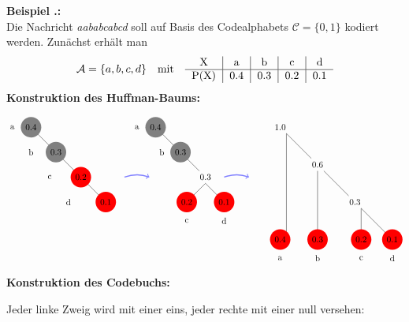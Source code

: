 \documentclass[a4paper,12pt]{article}
\newcommand{\A}{\mathcal A}
\newcommand{\C}{\mathcal C}
\newcounter{Beispiel}
\newenvironment{Beispiel}{
\medskip
        
        \setlength{\parindent}{0pt}
        \addtocounter{Beispiel}{1}
        \textbf{\textsf{Beispiel \thesubsection.\theBeispiel}:}\\}{
        \nopagebreak
        \vspace{-1.0ex}
        \bigskip
        
}
\begin{document}
\begin{Beispiel}
Die Nachricht {\it aababcabcd} soll auf Basis des Codealphabets $\C=\{0,1\}$ kodiert werden. Zunächst erhält man
\begin{align*}
 \A = \{a, b, c, d\}\quad \text{mit}\quad
\begin{tabular}{c|c|c|c|c}
X & a & b & c & d
\\
\hline
P(X) & 0.4 & 0.3 & 0.2 & 0.1
\\
\end{tabular} 
\end{align*}
\textbf{Konstruktion des Huffman-Baums:}
\par
\vspace{0.5cm}
\begin{align*}
\begin{tikzpicture}
 \draw(0.0,-0.75)node[]{a}
		(0.75,-0.75)node[circle=0.3cm,fill = gray]{0.4}
		 (1.0,-1.0) -- (1.5,-1.5)
		(1.75,-1.75) node [circle=0.3cm,fill = gray]{0.3}
		(0.75,-1.75) node []{b}
		(2.0,-2.0) -- (2.5,-2.5);
		\draw[->, blue!50, very thick] (4.5,-2.75) to[bend left=20]
 (5.5,-2.75);
		\draw
		(2.75,-2.75) node [circle=0.3cm, fill=red]{0.2}
		(1.5,-2.75) node []{c}
			(3.0,-3.0) -- (3.5,-3.5)
			(3.75,-3.75) node [circle=0.3cm, fill=red]{0.1}
			(2.25,-3.75) node []{d}
	(5.0,-0.75)node[]{a}
	(5.75,-0.75) node [circle=0.3cm,fill = gray]{0.4}
  (6.0,-1.0) -- (6.5,-1.5)
	(6.0,-1.75)node[]{b}
	(6.75,-1.75) node [circle=0.3cm,fill = gray]{0.3}
(7.0,-2.0) -- (7.5,-2.5)
(7.75,-2.75) node [circle=0.3cm]{0.3}
		(7.75,-3.0) -- (7.25,-3.5)
		(7.0,-4.5)node[]{c}
		(7.0,-3.75) node [circle=0.3cm, fill=red]{0.2};
		\draw[->, blue!50, very thick] (8.5,-2.75) to[bend left=20]
 (9.5,-2.75);
		\draw
		(7.75,-3.0) -- (8.25,-3.5)
		(8.5,-4.5)node[]{d}
		(8.5,-3.75) node [circle=0.3cm, fill=red]{0.1}
	(10.75,-0.75) node []{1.0}
	(11.0,-1.0) -- (11.0,-5.0)
  (11.0,-1.0) -- (12.0,-2.0)
	(12.25,-2.25) node []{0.6}
	(12.25,-2.5) -- (12.25,-5.0)
	(12.5,-2.5) -- (13.5,-3.5)
	(13.75,-3.75) node []{0.3}
	(14.0,-4.0) -- (15.0,-5.0)
	(14.0,-4.0) -- (14.0,-5.0)
	(15.25,-5.25) node [circle=0.3cm, fill=red]{0.1}
	(15.25,-6.0)node[]{d}
	(14.0,-5.25) node [circle=0.3cm, fill=red]{0.2}
	(14.0,-6.0)node[]{c}
	(12.25,-5.25) node [circle=0.3cm, fill=red]{0.3}
	(12.25,-6.0)node[]{b}
	(10.75,-5.25) node [circle=0.3cm, fill=red]{0.4}
	(10.75,-6.0)node[]{a};
\end{tikzpicture}
\end{align*}
\textbf{Konstruktion des Codebuchs:}
\par
Jeder linke Zweig wird mit einer eins, jeder rechte mit einer null versehen:

\end{Beispiel}
\end{document}

